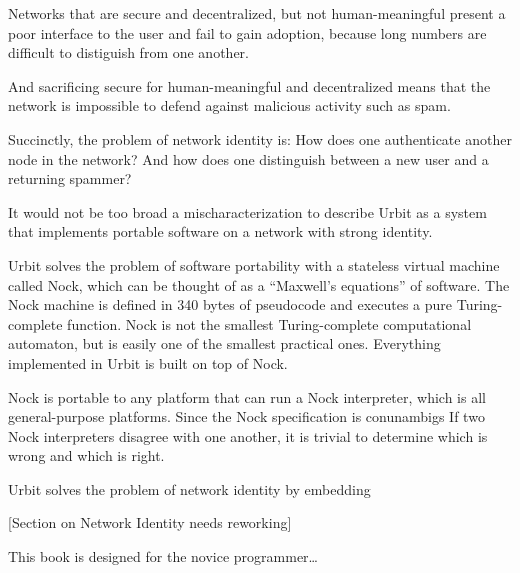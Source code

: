 Networks that are secure and decentralized, but not human-meaningful present a
poor interface to the user and fail to gain adoption, because long numbers are
difficult to distiguish from one another. 

And sacrificing secure for human-meaningful and decentralized means that the
network is impossible to defend against malicious activity such as spam.

Succinctly, the problem of network identity is: How does one authenticate
another node in the network? And how does one distinguish between a new user
and a returning spammer?

It would not be too broad a mischaracterization to describe Urbit as a system
that implements portable software on a network with strong identity.

Urbit solves the problem of software portability with a stateless virtual
machine called Nock, which can be thought of as a ``Maxwell's equations'' of
software. The Nock machine is defined in 340 bytes of pseudocode and executes a
pure Turing-complete function. Nock is not the smallest Turing-complete
computational automaton, but is easily one of the smallest practical ones.
Everything implemented in Urbit is built on top of Nock.

Nock is portable to any platform that can run a Nock interpreter, which is all
general-purpose platforms. Since the Nock specification is conunambigs If two
Nock interpreters disagree with one another, it is trivial to determine which
is wrong and which is right.

Urbit solves the problem of network identity by embedding 

[Section on Network Identity needs reworking]

This book is designed for the novice programmer\ldots{}